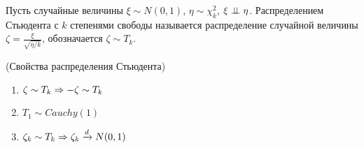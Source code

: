 \begin{definition}
    Пусть случайные величины $\xi \sim N(0, 1)$, $\eta \sim \chi^2_k$, $\xi \perp\mkern-9.5mu\perp \eta$. Распределением Стьюдента с $k$ степенями свободы называется распределение случайной величины $\zeta = \frac{\xi}{\sqrt{\eta / k}}$, обозначается $\zeta \sim T_k$.
\end{definition}

\begin{proposition} (Свойства распределения Стьюдента)
    \begin{enumerate}
        \item $\zeta \sim T_k \Rightarrow -\zeta \sim T_k$
        \item $T_1 \sim Cauchy(1)$
        \item $\zeta_k \sim T_k \Rightarrow \zeta_k \xrightarrow{d} N(0, 1)$
    \end{enumerate}
\end{proposition}

